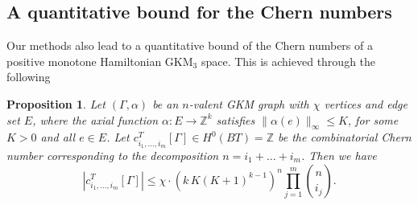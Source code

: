 \documentclass[12pt,a4paper]{amsart}
\newcommand{\ZZ}{\mathbb{Z}}
\newtheorem{prop}[thm]{Proposition}
\theoremstyle{plain}
\theoremstyle{definition}
\begin{document}
\subsection{A quantitative bound for the Chern numbers}
Our methods also lead to a quantitative bound of the Chern numbers of a positive monotone Hamiltonian GKM$_3$ space. This is achieved through the following

\begin{prop}\label{prop: chernbound}
Let $(\Gamma,\alpha)$ be an $n$-valent GKM graph with $\chi$ vertices and edge set $E$, where the axial function $\alpha\colon E\rightarrow \ZZ^k$ satisfies $\|\alpha(e)\|_\infty \leq K$, for some $K>0$ and all $e\in E$. 
Let $c^T_{i_1,\ldots,i_m}[\Gamma]\in  H^{0}(BT)=\ZZ$ be the combinatorial Chern number corresponding to the decomposition $n=i_1+\ldots+i_m$. Then we have
\[|c^T_{i_1,\ldots,i_m}[\Gamma]|\leq\chi\cdot (k\,K (K+1)^{k-1})^n\prod_{j=1}^m {n\choose i_j}.\]
\end{prop}
\end{document}
